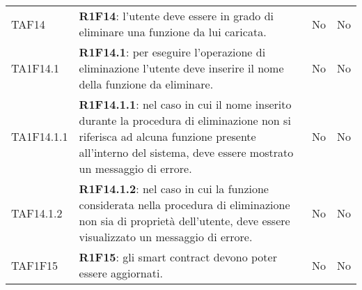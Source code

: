 \begin{longtable}{
		>{\centering}p{} 
		>{}p{}
		>{\centering}p{}
		>{\centering}p{} }
	TAF14 		& \textbf{R1F14}: l'utente deve essere in grado di eliminare una funzione da lui caricata. 																								& No & No \tabularnewline
	TA1F14.1 	& \textbf{R1F14.1}: per eseguire l'operazione di eliminazione l'utente deve inserire il nome della funzione da eliminare. 																	& No & No \tabularnewline
	TA1F14.1.1 	& \textbf{R1F14.1.1}: nel caso in cui il nome inserito durante la procedura di eliminazione non si riferisca ad alcuna funzione presente all'interno del sistema, deve essere mostrato un messaggio di errore.	& No & No \tabularnewline
	TAF14.1.2 	& \textbf{R1F14.1.2}: nel caso in cui la funzione considerata nella procedura di eliminazione non sia di proprietà dell'utente, deve essere visualizzato un messaggio di errore.				& No & No \tabularnewline
	TAF1F15		& \textbf{R1F15}: gli smart contract\ped{\textit{G}} devono poter essere aggiornati.																															& No & No \tabularnewline

\end{longtable}
